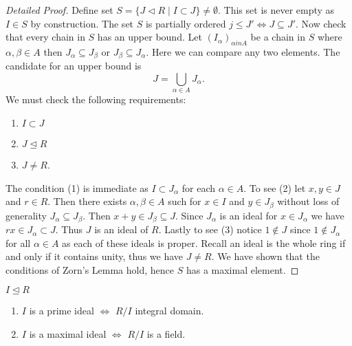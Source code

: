\documentclass[master.tex]{subfiles}
\begin{document}
\begin{proof}[Detailed Proof]
  Define set \(S=\{J \lhd R \mid I \subset J\} \neq \emptyset\). This set is never empty as \(I \in S\) by
  construction. The set \(S\) is partially ordered \(j \le J' \iff J \subseteq J'\). Now check that every chain in \(S\)
  has an upper bound. Let \((I_\alpha)_{\alpha in A}\) be a chain in \(S\) where \(\alpha, \beta \in A\) then
  \(J_\alpha \subseteq J_\beta\) or \(J_\beta \subseteq J_\alpha\). Here we can compare any two elements. The candidate
  for an upper bound is
  \[J=\bigcup_{\alpha \in A} J_\alpha.\] We must check the following requirements:
  \begin{enumerate}[label=(\arabic*)]
  \item \(I \subset J\)
  \item \(J \unlhd R\)
  \item \(J \neq R\).
  \end{enumerate}
  The condition (1) is immediate as \(I \subset J_\alpha\) for each \(\alpha \in A\). To see (2) let \(x,y \in J\) and
  \(r \in R\). Then there exists \(\alpha, \beta \in A\) such for \(x \in I\) and \(y \in J_\beta\) without loss of
  generality \(J_\alpha \subseteq J_\beta\). Then \(x+y \in J_\beta \subseteq J\). Since \(J_\alpha\) is an ideal for
  \(x \in J_\alpha\) we have \(rx \in J_\alpha \subset J\). Thus \(J\) is an ideal of \(R\). Lastly to see (3) notice
  \(1 \not \in J\) since \(1 \not \in J_\alpha\) for all \(\alpha \in A\) as each of these ideals is proper. Recall an
  ideal is the whole ring if and only if it contains unity, thus we have \(J \neq R\). We have shown that the conditions
  of Zorn's Lemma hold, hence \(S\) has a maximal element.
\end{proof}

\begin{prop}
  \(I \unlhd R\)
  \begin{enumerate}[label=(\alph*)]
  \item \(I\) is a prime ideal \(\iff\) \(R/I\) integral domain.
  \item \(I\) is a maximal ideal \(\iff\) \(R/I\) is a field.
  \end{enumerate}
\end{prop}
\end{document}
